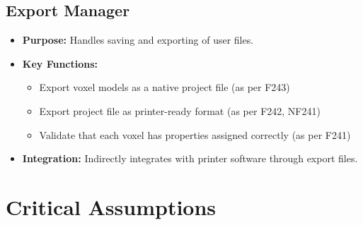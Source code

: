 \documentclass{article}
\begin{document}
\subsection{Export Manager}
\begin{itemize}
    \item \textbf{Purpose:} Handles saving and exporting of user files.
    \item \textbf{Key Functions:} 
    \begin{itemize}
        \item Export voxel models as a native project file (as per F243)
        \item Export project file as printer-ready format (as per F242, NF241)
        \item Validate that each voxel has properties assigned correctly (as per F241)
    \end{itemize}
    \item \textbf{Integration:} Indirectly integrates with printer software through export files.
\end{itemize}


\section{Critical Assumptions}



\iffalse
\wss{Include your FMEA table here. This is the most important part of this document.}
\wss{The safety requirements in the table do not have to have the prefix SR.
The most important thing is to show traceability to your SRS. You might trace to
requirements you have already written, or you might need to add new
requirements.}
\wss{If no safety requirement can be devised, other mitigation strategies can be
entered in the table, including strategies involving providing additional
documentation, and/or test cases.}
\fi
\end{document}
